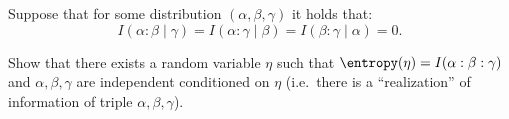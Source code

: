 Suppose that for some distribution $(\alpha, \beta, \gamma)$ it holds that:
$$
    I(\alpha : \beta \mid \gamma) = I(\alpha : \gamma \mid \beta) = I(\beta : \gamma \mid \alpha) = 0.
$$

Show that there exists a random variable $\eta$ such that $\entropy(\eta) = I(\alpha : \beta : \gamma)$
and $\alpha, \beta, \gamma$ are independent conditioned on $\eta$ (i.e.\ there is a ``realization'' of
information of triple $\alpha, \beta, \gamma$).